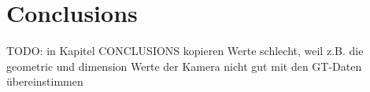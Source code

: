 \section{Conclusions}
	 TODO: in Kapitel CONCLUSIONS kopieren
	 Werte schlecht, weil z.B. die geometric und dimension Werte der Kamera nicht gut mit den GT-Daten übereinstimmen